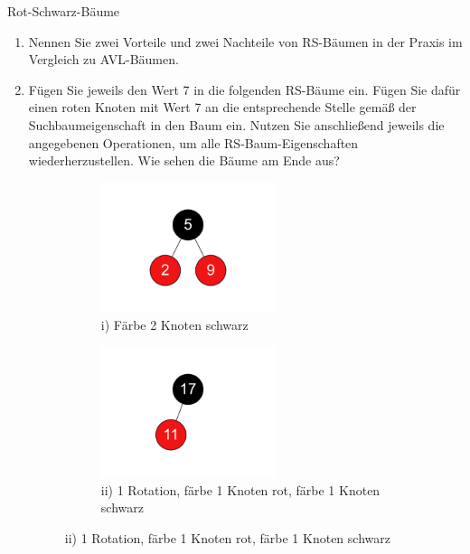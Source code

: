 \documentclass[11pt,a4paper]{article}
\begin{document}
\begin{aufgabe}{2}{Rot-Schwarz-Bäume}
    \begin{enumerate}
        \item
        Nennen Sie zwei Vorteile und zwei Nachteile von RS-Bäumen in der Praxis im Vergleich zu AVL-Bäumen.

        \item Fügen Sie jeweils den Wert 7 in die folgenden RS-Bäume ein.
        Fügen Sie dafür einen roten Knoten mit Wert 7 an die entsprechende Stelle gemäß der Suchbaumeigenschaft in den Baum ein.
        Nutzen Sie anschließend jeweils die angegebenen Operationen, um alle RS-Baum-Eigenschaften wiederherzustellen.
        Wie sehen die Bäume am Ende aus?

        \begin{figure}[h!]
            \centering
            \begin{subfigure}[t]{0.3\textwidth}
                \centering
                \includegraphics[width=0.6\textwidth]{img/2a_1}
                \caption*{i) Färbe 2 Knoten schwarz}
            \end{subfigure}
            \begin{subfigure}[t]{0.3\textwidth}
                \centering
                \includegraphics[width=0.6\textwidth]{img/2a_2}
                \caption*{ii) 1 Rotation, färbe 1 Knoten rot, färbe 1 Knoten schwarz}

\end{subfigure}
\end{figure}
\end{enumerate}
\end{aufgabe}
\end{document}
